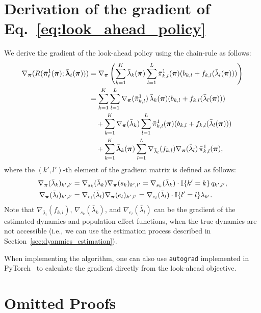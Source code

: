 \section{Derivation of the gradient of Eq.~\eqref{eq:look_ahead_policy}} \label{app:gradient}

We derive the gradient of the look-ahead policy using the chain-rule as follows:
\begin{align*}
    \nabla_{\bm{\pi}} (R(\bar{\bm{\pi}}_t^{1}(\bm{\pi}); \bar{\bm{\lambda}}_t(\bm{\pi}))) 
    &= \nabla_{\bm{\pi}} \left( \sum_{k=1}^{K} \bar{\lambda}_{k}(\bm{\pi}) \sum_{l=1}^L \bar{\pi}_{k,l}^{1}(\bm{\pi}) (b_{k,l} + f_{k,l}(\bar{\lambda}_l(\bm{\pi}))) \right) \\
    &= \sum_{k=1}^{K} \sum_{l=1}^L \nabla_{\bm{\pi}} (\bar{\pi}_{k,l}^{1}) \, \bar{\lambda}_k(\bm{\pi}) (b_{k,l} + f_{k,l}(\bar{\lambda}_l(\bm{\pi}))) \\
    & \quad + \sum_{k=1}^K \nabla_{\bm{\pi}} (\bar{\lambda}_k) \sum_{l=1}^L \bar{\pi}_{k,l}^{1}(\bm{\pi}) (b_{k,l} + f_{k,l}(\bar{\lambda}_l(\bm{\pi}))) \\
    & \quad + \sum_{k=1}^K \bar{\bm{\lambda}}_k(\bm{\pi}) \sum_{l=1}^L \nabla_{\bar{\lambda}_l} (f_{k,l}) \nabla_{\bm{\pi}} (\bar{\lambda}_l) \, \bar{\pi}_{k,l}^{1}(\bm{\pi}),
\end{align*}
where the $(k', l')$-th element of the gradient matrix is defined as follows:
\begin{align*}
    \nabla_{\bm{\pi}} (\bar{\lambda}_k)_{k',l'} 
    &= \nabla_{s_k} (\bar{\lambda}_k) \nabla_{\bm{\pi}} (s_k)_{k',l'} 
    = \nabla_{s_k} (\bar{\lambda}_k) \cdot \mathbb{I} \{ k' = k \} \, q_{k',l'}, \\
    \nabla_{\bm{\pi}} (\bar{\lambda}_l)_{k',l'} 
    &= \nabla_{e_l} (\bar{\lambda}_l) \nabla_{\bm{\pi}} (e_l)_{k',l'} 
    = \nabla_{e_l} (\bar{\lambda}_l) \cdot \mathbb{I} \{ l' = l \} \lambda_{k'}.
\end{align*}
Note that $\nabla_{\bar{\lambda}_l} (f_{k,l})$, $\nabla_{s_k} (\bar{\lambda}_k)$, and $\nabla_{e_l} (\bar{\lambda}_l)$ can be the gradient of the estimated dynamics and population effect functions, when the true dynamics are not accessible (i.e., we can use the estimation process described in Section~\ref{sec:dyanmics_estimation}).

When implementing the algorithm, one can also use \texttt{autograd} implemented in PyTorch~\citep{paszke2019pytorch} to calculate the gradient directly from the look-ahead objective.

\section{Omitted Proofs} \label{app:proofs}

